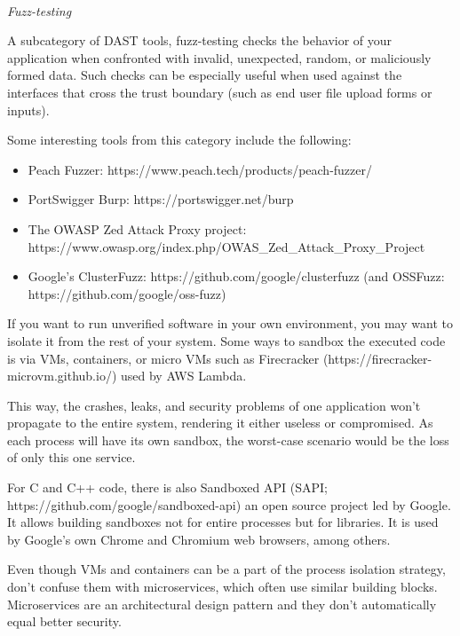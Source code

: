\hspace*{\fill} \\ %
\noindent
\textit{Fuzz-testing}

A subcategory of DAST tools, fuzz-testing checks the behavior of your application when confronted with invalid, unexpected, random, or maliciously formed data. Such checks can be especially useful when used against the interfaces that cross the trust boundary (such as end user file upload forms or inputs).

Some interesting tools from this category include the following:

\begin{itemize}
\item 
Peach Fuzzer: https://www.peach.tech/products/peach-fuzzer/

\item 
PortSwigger Burp: https://portswigger.net/burp

\item 
The OWASP Zed Attack Proxy project: https://www.owasp.org/index.php/OWAS\_Zed\_Attack\_Proxy\_Project

\item 
Google's ClusterFuzz: https://github.com/google/clusterfuzz (and OSSFuzz: https://github.com/google/oss-fuzz)
\end{itemize}


If you want to run unverified software in your own environment, you may want to isolate it from the rest of your system. Some ways to sandbox the executed code is via VMs, containers, or micro VMs such as Firecracker (https://firecracker-microvm.github.io/) used by AWS Lambda.

This way, the crashes, leaks, and security problems of one application won't propagate to the entire system, rendering it either useless or compromised. As each process will have its own sandbox, the worst-case scenario would be the loss of only this one service.

For C and C++ code, there is also Sandboxed API (SAPI; https://github.com/google/sandboxed-api) an open source project led by Google. It allows building sandboxes not for entire processes but for libraries. It is used by Google's own Chrome and Chromium web browsers, among others.

Even though VMs and containers can be a part of the process isolation strategy, don't confuse them with microservices, which often use similar building blocks. Microservices are an architectural design pattern and they don't automatically equal better security.

















